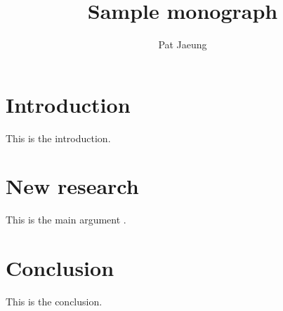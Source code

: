 \documentclass{langscibook}
\author{Pat Jaeung}
\title{Sample monograph}
\subtitle{}
\begin{document}
\maketitle
\frontmatter
{} %
\tableofcontents
\mainmatter
\chapter{Introduction}
This is the introduction.
\chapter{New research}
This is the main argument \citep{Chomsky1957}.
\chapter{Conclusion}
This is the conclusion.

\backmatter
\sloppy
{}%
\printbibliography[heading=\lsReferencesTitle]
\cleardoublepage

{}
\ohead{\lsNameIndexTitle}
\printindex
\cleardoublepage

{}
\ohead{\lsLanguageIndexTitle}
\printindex[lan]
\cleardoublepage

{}
\ohead{\lsSubjectIndexTitle}
\printindex[sbj]
\ohead{}
\end{document}
